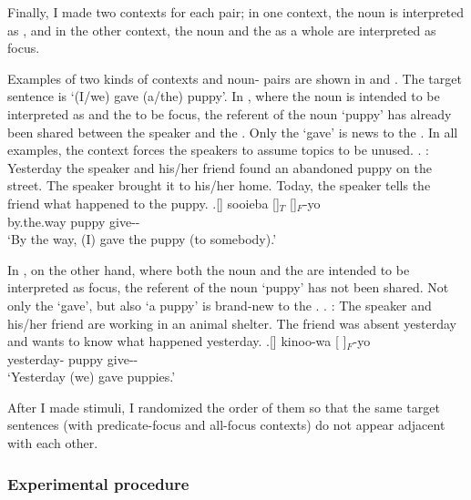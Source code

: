 Finally, I made two contexts for each pair;
in one context, the noun is interpreted as ,
and in the other context, the noun and the  as a whole are interpreted as focus.

Examples of two kinds of contexts and noun- pairs are shown in \Next and \NNext.
The target sentence is  `(I/we) gave (a/the) puppy'.
In \Next, where the noun is intended to be interpreted as  and the  to be focus,
the referent of the noun  `puppy' has already been shared between the speaker and the .
Only the   `gave' is news to the .
In all examples,
the context forces the speakers to assume topics to be unused.
%
\ex.\label{koinut}
: Yesterday the speaker and his/her friend found an abandoned puppy on the street. The speaker brought it to his/her home. Today, the speaker tells the friend what happened to the puppy.
\ag.[] sooieba []$_{T}$ []$_{F}$-yo \\
by.the.way puppy give-- \\
`By the way, (I) gave the puppy (to somebody).'

In \Next, on the other hand,
where both the noun and the  are intended to be interpreted as focus,
the referent of the noun  `puppy' has not been shared.
Not only the  `gave', but also `a puppy' is brand-new to the .
%
\ex.\label{koinuf}
 : The speaker and his/her friend are working in an animal shelter. The friend was absent yesterday and wants to know what happened yesterday.
\ag.[] kinoo-wa [ ]$_{F}$-yo \\
yesterday- puppy give-- \\
`Yesterday (we) gave puppies.'



After I made stimuli,
I randomized the order of them so that
the same target sentences (with predicate-focus and all-focus contexts)
do not appear adjacent with each other.

\subsubsection{Experimental procedure}\label{Int:IUISUnitExp:Meth:Proc}

